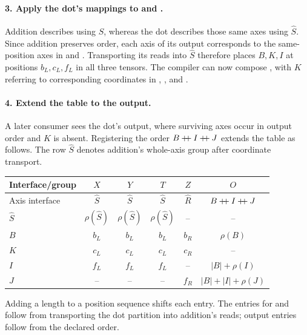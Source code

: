 \paragraph{3. Apply the dot's mappings to  and .}
Addition describes  using $S$, whereas the dot describes those same
axes using $\widehat S$. Since addition preserves order, each axis of its
output corresponds to the same-position axes in  and .
Transporting its reads into $\widehat S$ therefore places $B,K,I$ at positions
$b_L,c_L,f_L$ in all three tensors. The compiler can now compose
, with $K$ referring to corresponding
coordinates in , , and .

\paragraph{4. Extend the table to the output.}
A later consumer sees the dot's output, where surviving axes occur in output
order and $K$ is absent. Registering the order $B\mathbin{+\!\!+} I\mathbin{+\!\!+} J$ extends
the table as follows. The row $\widehat S$ denotes addition's whole-axis group
after coordinate transport.
\begin{center}
\small
\setlength{\tabcolsep}{4pt}
\begin{tabular}{@{}lccccc@{}}\toprule
Interface/group & $X$ & $Y$ & $T$ & $Z$ & $O$\\\midrule
Axis interface & $\widehat S$ & $\widehat S$ & $\widehat S$ & $\widehat R$ & $B\mathbin{+\!\!+} I\mathbin{+\!\!+} J$\\
$\widehat S$ & $\rho(\widehat S)$ & $\rho(\widehat S)$ & $\rho(\widehat S)$ & -- & --\\
$B$ & $b_L$ & $b_L$ & $b_L$ & $b_R$ & $\rho(B)$\\
$K$ & $c_L$ & $c_L$ & $c_L$ & $c_R$ & --\\
$I$ & $f_L$ & $f_L$ & $f_L$ & -- & $|B|+\rho(I)$\\
$J$ & -- & -- & -- & $f_R$ & $|B|+|I|+\rho(J)$\\\bottomrule
\end{tabular}
\end{center}
Adding a length to a position sequence shifts each entry. The entries for
 and  follow from transporting the dot partition into
addition's reads; output entries follow from the declared order.

